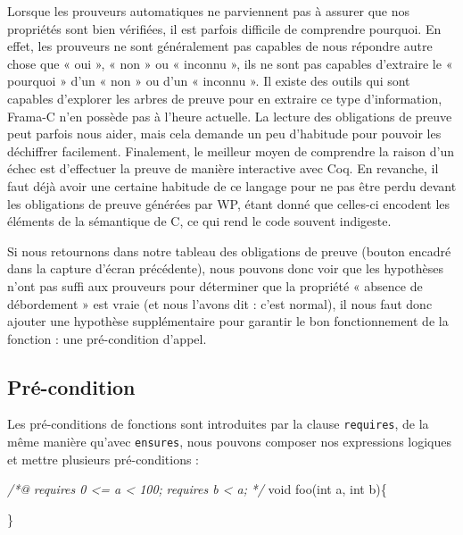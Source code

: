 \documentclass[12pt,francais,]{scrbook}
\newenvironment{Shaded}{}{}
\newcommand{\DataTypeTok}[1]{\textcolor[rgb]{0.56,0.13,0.00}{{#1}}}
\newcommand{\CommentTok}[1]{\textcolor[rgb]{0.38,0.63,0.69}{\textit{{#1}}}}
\newcommand{\NormalTok}[1]{{#1}}
\begin{document}
Lorsque les prouveurs automatiques ne parviennent pas à assurer que nos
propriétés sont bien vérifiées, il est parfois difficile de comprendre
pourquoi. En effet, les prouveurs ne sont généralement pas capables de
nous répondre autre chose que « oui », « non » ou « inconnu », ils ne
sont pas capables d'extraire le « pourquoi » d'un « non » ou d'un «
inconnu ». Il existe des outils qui sont capables d'explorer les arbres
de preuve pour en extraire ce type d'information, Frama-C n'en possède
pas à l'heure actuelle. La lecture des obligations de preuve peut
parfois nous aider, mais cela demande un peu d'habitude pour pouvoir les
déchiffrer facilement. Finalement, le meilleur moyen de comprendre la
raison d'un échec est d'effectuer la preuve de manière interactive avec
Coq. En revanche, il faut déjà avoir une certaine habitude de ce langage
pour ne pas être perdu devant les obligations de preuve générées par WP,
étant donné que celles-ci encodent les éléments de la sémantique de C,
ce qui rend le code souvent indigeste.

Si nous retournons dans notre tableau des obligations de preuve (bouton
encadré dans la capture d'écran précédente), nous pouvons donc voir que
les hypothèses n'ont pas suffi aux prouveurs pour déterminer que la
propriété « absence de débordement » est vraie (et nous l'avons dit :
c'est normal), il nous faut donc ajouter une hypothèse supplémentaire
pour garantir le bon fonctionnement de la fonction : une pré-condition
d'appel.

\subsection{Pré-condition}\label{pruxe9-condition}

Les pré-conditions de fonctions sont introduites par la clause
\texttt{requires}, de la même manière qu'avec \texttt{ensures}, nous
pouvons composer nos expressions logiques et mettre plusieurs
pré-conditions :

\begin{footnotesize}\begin{Shaded}
\begin{Highlighting}[]
\CommentTok{/*@}
\CommentTok{  requires 0 <= a < 100;}
\CommentTok{  requires b < a;}
\CommentTok{*/}
\DataTypeTok{void} \NormalTok{foo(}\DataTypeTok{int} \NormalTok{a, }\DataTypeTok{int} \NormalTok{b)\{}
  
\NormalTok{\}}
\end{Highlighting}
\end{Shaded}\end{footnotesize}
\end{document}
